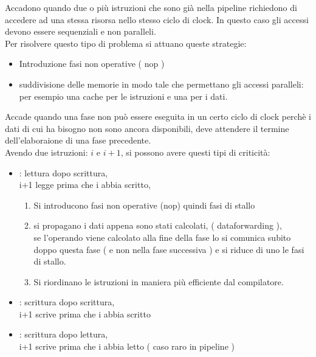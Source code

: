 \documentclass[arch.tex]{subfiles}
\begin{document}
%
\label{par:problemi_strutturali}
Accadono quando due o più istruzioni che sono già nella pipeline richiedono di 
accedere ad una stessa risorsa nello stesso ciclo di clock. In questo caso 
gli accessi devono essere sequenziali e non paralleli.\\
Per risolvere questo tipo di problema si attuano queste strategie:

\begin{itemize}
	\item Introduzione fasi non operative ( nop ) 
	\item suddivisione delle memorie in modo tale che permettano gli
		accessi paralleli:\\
		per esempio una cache per le istruzioni e una per i dati.
\end{itemize}

%
\label{par:dipendenza_dai_dati}
Accade quando una fase non può essere eseguita in un certo ciclo di clock 
perchè i dati di cui ha bisogno non sono ancora disponibili, deve attendere
il termine dell'elaboraione di una fase precedente.\\
Avendo due istruzioni: $i$ e $i+1$, si possono 
avere questi tipi di criticità:

\begin{itemize}
	\item {}: lettura dopo scrittura,\\
		i+1 legge prima che i abbia scritto,
		\begin{enumerate}
		\item Si introducono fasi non operative (nop) quindi fasi di stallo
		\item si propagano i dati appena sono stati calcolati, 
			( dataforwarding ),\\
		se l'operando viene calcolato alla fine della fase  
		lo si comunica subito doppo questa fase ( e non nella fase successiva
		  )  e si riduce di uno le fasi di stallo.
		\item Si riordinano le istruzioni in maniera più efficiente dal compilatore.
		\end{enumerate}
	\item {}: scrittura dopo scrittura,\\
		i+1 scrive prima che i abbia scritto
	\item {}: scrittura dopo lettura,\\
		i+1 scrive prima che i abbia letto ( caso raro in pipeline )  
\end{itemize}
\end{document}
